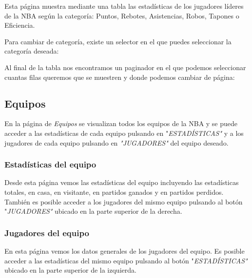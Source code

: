 Esta página muestra mediante una tabla las estadísticas de los jugadores líderes de la NBA según la categoría: Puntos, Rebotes, Asistencias, Robos, Tapones o Eficiencia.


Para cambiar de categoría, existe un selector en el que puedes seleccionar la categoría deseada:

Al final de la tabla nos encontramos un paginador en el que podemos seleccionar cuantas filas queremos que se muestren y donde podemos cambiar de página:

\clearpage

\subsection{Equipos}

En la página de \textit{Equipos} se visualizan todos los equipos de la NBA y se puede acceder a las estadísticas de cada equipo pulsando en "\textit{ESTADÍSTICAS"} y a los jugadores de cada equipo pulsando en \textit{"JUGADORES"} del equipo deseado.


\subsubsection{Estadísticas del equipo}

Desde esta página vemos las estadísticas del equipo incluyendo las estadísticas totales, en casa, en visitante, en partidos ganados y en partidos perdidos. También es posible acceder a los jugadores del mismo equipo pulsando al botón "\textit{JUGADORES"} ubicado en la parte superior de la derecha.

\subsubsection{Jugadores del equipo}

En esta página vemos los datos generales de los jugadores del equipo. Es posible acceder a las estadísticas del mismo equipo pulsando al botón "\textit{ESTADÍSTICAS"} ubicado en la parte superior de la izquierda.

